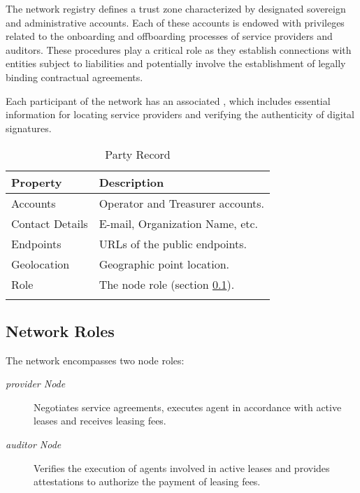 \documentclass{oc}
\begin{document}
The network registry defines a trust zone characterized by designated sovereign and administrative accounts. Each of these accounts is endowed with privileges related to the onboarding and offboarding processes of service providers and auditors.
These procedures play a critical role as they establish connections with entities subject to liabilities and potentially involve the establishment of legally binding contractual agreements.

Each participant of the network has an associated , which includes essential information for locating service providers and verifying the authenticity of digital signatures.

\begin{xltabular}{\linewidth}{ l  X }
  \caption{Party Record} 
  \label{table:party-record}\\
  \toprule
   Property & Description  \\
  \midrule
  \endfirsthead
  \endhead
  \bottomrule
  \endfoot
  
  Accounts & Operator and Treasurer accounts. \\ \addlinespace
  
  Contact Details & E-mail, Organization Name, etc. \\   \addlinespace
  
  Endpoints & URLs\cite{rfc3986} of the public endpoints. \\  \addlinespace
  
  Geolocation & Geographic point location\cite{iso6709}. \\  \addlinespace
    
  Role & The node role (section \ref{sec:network-roles}). \\ \addlinespace
  
\end{xltabular}

\subsection{Network Roles}\label{sec:network-roles}

The network encompasses two node roles:
\begin{description}
  \item[\emph{\Gls*{provider} Node}] Negotiates service agreements, executes agent in accordance with active leases and receives leasing fees.
  \item[\emph{\Gls*{auditor} Node}] Verifies the execution of agents involved in active leases and provides attestations to authorize the payment of leasing fees.
\end{description}
\end{document}
